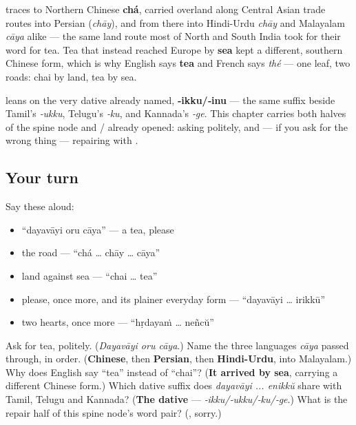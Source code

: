 \begin{cousinweb}
\textbf{} traces to Northern Chinese \textbf{chá}, carried overland along Central Asian trade routes into Persian \textbf{} (\emph{chāy}), and from there into Hindi-Urdu \emph{chāy} and Malayalam \emph{cāya} alike — the same land route most of North and South India took for their word for tea. Tea that instead reached Europe by \textbf{sea} kept a different, southern Chinese form, which is why English says \textbf{tea} and French says \emph{thé} — one leaf, two roads: chai by land, tea by sea.
\end{cousinweb}

\begin{grammarlens}[title={Grammar Lens: the two hearts, and the spine node so far}]
\textbf{  } leans on the very dative already named, \textbf{‑ikku/‑inu} — the same suffix beside Tamil's \emph{‑ukku}, Telugu's \emph{‑ku}, and Kannada's \emph{‑ge}. This chapter carries both halves of the spine node \textbf{} and \textbf{}/\textbf{} already opened: asking politely, and — if you ask for the wrong thing — repairing with \textbf{}.
\end{grammarlens}

\subsection*{Your turn}
Say these aloud:

\begin{itemize}
\raggedright
  \item \textquotedblleft{}dayavāyi oru cāya\textquotedblright{} — a tea, please
  \item the road — \textquotedblleft{}chá … chāy … cāya\textquotedblright{}
  \item land against sea — \textquotedblleft{}chai … tea\textquotedblright{}
  \item please, once more, and its plainer everyday form — \textquotedblleft{}dayavāyi … irikkū\textquotedblright{}
  \item two hearts, once more — \textquotedblleft{}hṛdayaṁ … neñcŭ\textquotedblright{}
\end{itemize}

\begin{tcolorbox}[breakable,colback=teal!4,colframe=teal!35!black,title={Before you move on}]
Ask for tea, politely. (\emph{Dayavāyi oru cāya}.) Name the three languages \emph{cāya} passed through, in order. (\textbf{Chinese}, then \textbf{Persian}, then \textbf{Hindi-Urdu}, into Malayalam.) Why does English say \textquotedblleft{}tea\textquotedblright{} instead of \textquotedblleft{}chai\textquotedblright{}? (\textbf{It arrived by sea}, carrying a different Chinese form.) Which dative suffix does \emph{dayavāyi ... enikkŭ} share with Tamil, Telugu and Kannada? (\textbf{The dative} — \emph{‑ikku/‑ukku/‑ku/‑ge}.) What is the repair half of this spine node's word pair? (\textbf{}, sorry.)
\end{tcolorbox}
